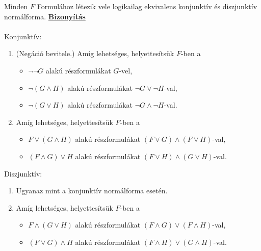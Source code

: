 \documentclass{beamer}
\newcommand{\msmallskip}{\vspace{0.3em}}
\newcommand{\mmedskip}{\vspace{0.5em}}
\newcommand{\mbigskip}{\vspace{1em}}
\begin{document}
\begin{frame}

\begin{tcolorbox}[squeezed title={Tétel: Konjunktív és diszjunktív normálforma létezése}]
Minden $F$ Formulához létezik vele logikailag ekvivalens konjunktív és diszjunktív normálforma.
\tcblower
\msmallskip
\underline{\textbf{Bizonyítás}}\\
\mmedskip
\\
Konjunktív:
\begin{enumerate}
\color{black}
	\item (Negáció bevitele.) Amíg lehetséges, helyettesítsük $F$-ben a
	\begin{itemize}
		\item $\neg \neg G$ alakú részformulákat $G$-vel,
		\item $\neg (G \land H)$ alakú részformulákat $\neg G \lor \neg H$-val,
		\item $\neg (G \lor H)$ alakú részformulákat $\neg G \land \neg H$-val.
	\end{itemize}
	\item Amíg lehetséges, helyettesítsük $F$-ben a
	\begin{itemize}
		\item $F \lor (G \land H)$ alakú részformulákat $(F \lor G) \land (F \lor H)$-val,
		\item $(F \land G) \lor H$ alakú részformulákat $(F \lor H) \land (G \lor H)$-val.
	\end{itemize}
\end{enumerate}
\mbigskip
Diszjunktív:
\begin{enumerate}
	\item Ugyanaz mint a konjunktív normálforma esetén.
	\item Amíg lehetséges, helyettesítsük $F$-ben a
	\begin{itemize}
		\item $F \land (G \lor H)$ alakú részformulákat $(F \land G) \lor (F \land H)$-val,
		\item $(F \lor G) \land H$ alakú részformulákat $(F \land H) \lor (G \land H)$-val.
	\end{itemize}
\end{enumerate}
\end{tcolorbox}

\end{frame}
\end{document}
